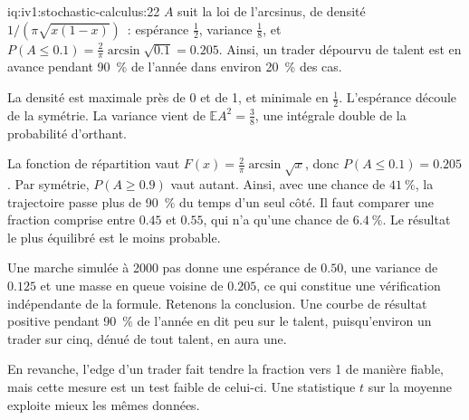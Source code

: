 \begin{solution}{iq:iv1:stochastic-calculus:22}
$A$ suit la loi de l'arcsinus, de densité $1/(\pi\sqrt{x(1 - x)})$~: espérance $\frac12$, variance $\frac18$, et $P(A \le 0.1) = \frac{2}{\pi}\arcsin\sqrt{0.1} = 0.205$. Ainsi, un trader dépourvu de talent est en avance pendant 90~\% de l'année dans environ 20~\% des cas.

La densité est maximale près de 0 et de 1, et minimale en $\frac12$. L'espérance découle de la symétrie. La variance vient de $\mathbb{E}A^2 = \frac38$, une intégrale double de la probabilité d'orthant.

La fonction de répartition vaut $F(x) = \frac{2}{\pi}\arcsin\sqrt{x}$, donc $P(A \le 0.1) = 0.205$. Par symétrie, $P(A \ge 0.9)$ vaut autant. Ainsi, avec une chance de $41~\%$, la trajectoire passe plus de 90~\% du temps d'un seul côté. Il faut comparer une fraction comprise entre $0.45$ et $0.55$, qui n'a qu'une chance de $6.4~\%$. Le résultat le plus équilibré est le moins probable.

Une marche simulée à 2000 pas donne une espérance de $0.50$, une variance de $0.125$ et une masse en queue voisine de $0.205$, ce qui constitue une vérification indépendante de la formule. Retenons la conclusion. Une courbe de résultat positive pendant 90~\% de l'année en dit peu sur le talent, puisqu'environ un trader sur cinq, dénué de tout talent, en aura une.

En revanche, l'edge d'un trader fait tendre la fraction vers 1 de manière fiable, mais cette mesure est un test faible de celui-ci. Une statistique $t$ sur la moyenne exploite mieux les mêmes données.



\end{solution}

